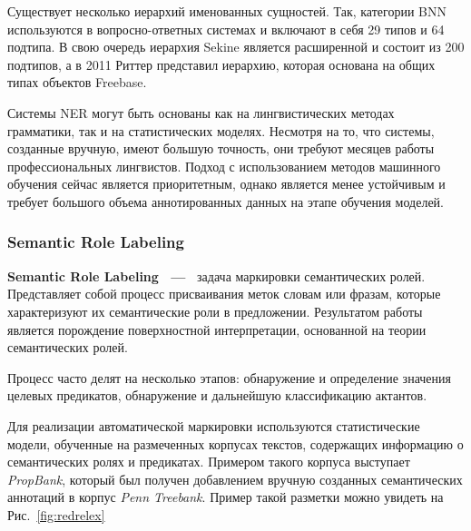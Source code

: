 Существует несколько иерархий именованных сущностей. Так, категории BNN используются в вопросно-ответных системах и включают в себя 29 типов и 64 подтипа. В свою очередь иерархия Sekine является расширенной и состоит из 200 подтипов, а в 2011 Риттер представил иерархию, которая основана на общих типах объектов Freebase. 

Системы NER могут быть основаны как на лингвистических методах грамматики, так и на статистических моделях. Несмотря на то, что системы, созданные вручную, имеют большую точность, они требуют месяцев работы профессиональных лингвистов. Подход с использованием методов машинного обучения сейчас является приоритетным, однако является менее устойчивым и требует большого объема аннотированных данных на этапе обучения моделей. 

\subsubsection{Semantic Role Labeling}
\textbf{Semantic Role Labeling  ~---~} задача маркировки семантических ролей. Представляет собой процесс присваивания меток словам или фразам, которые характеризуют их семантические роли в предложении. Результатом работы является порождение поверхностной интерпретации, основанной на теории семантических ролей.

Процесс часто делят на несколько этапов:  обнаружение и определение значения целевых предикатов, обнаружение и дальнейшую классификацию актантов. 

Для реализации автоматической маркировки используются статистические модели, обученные на размеченных корпусах текстов, содержащих информацию о семантических ролях и предикатах. Примером такого корпуса выступает \emph{PropBank}, который был получен добавлением вручную созданных семантических аннотаций в корпус \emph{Penn Treebank}. Пример такой разметки можно увидеть на Рис.~\ref{fig:redrelex}

